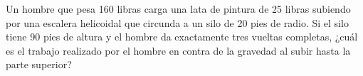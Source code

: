 \item Un hombre que pesa 160 libras carga una lata de pintura de 25 libras subiendo por una escalera helicoidal que circunda a un silo de 20 pies de radio. Si el silo tiene 90 pies de altura y el hombre da exactamente tres vueltas completas, ¿cuál es el trabajo realizado por el hombre en contra de la gravedad al subir hasta la parte superior?
